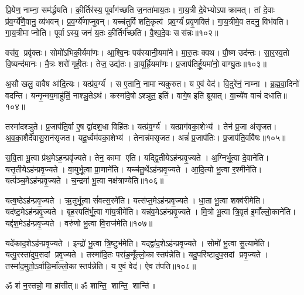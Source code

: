 प्रि॒येण॒ नाम्ना॒ सम॑र्द्धयति। 
की॒र्तिर॑स्य॒ पूर्वाग॑च्छति ज॒नता॑माय॒तः। 
गा॒य॒त्री दे॒वेभ्योऽपाक्रामत्। 
तां दे॒वाः प्र॑व॒र्ग्ये॑णै॒वानु॒ व्य॑भवन्। 
प्र॒व॒र्ग्ये॑णाप्नुवन्। 
यच्च॑तुर्विशति॒कृत्व॑ प्रव॒र्ग्यं॑ प्रवृ॒णक्ति॑। 
गा॒य॒त्रीमे॒व तदनु॒ विभ॑वति। 
गा॒य॒त्रीमाप्नोति। 
पूर्वाऽस्य॒ जनं॑ य॒तः की॒र्तिर्ग॑च्छति। 
वै॒श्व॒दे॒वः सस॑न्नः॥१०२॥

वस॑व॒ प्रवृ॑क्तः। 
सोमो॑ऽभिकी॒र्यमा॑णः। 
आ॒श्वि॒नः पय॑स्यानी॒यमा॑ने। 
मा॒रु॒तः क्वथ\sn{}। 
पौ॒ष्ण उद॑न्तः। 
सा॒र॒स्व॒तो वि॒ष्यन्द॑मानः। 
मै॒त्रः  शरो॑ गृही॒तः। 
तेज॒ उद्य॑तः। 
वा॒युर्ह्रि॒यमा॑णः। 
प्र॒जाप॑तिर्\mbox{}हू॒यमा॑नो॒ वाग्घु॒तः॥१०३॥

अ॒सौ खलु॒ वावैष आ॑दि॒त्यः। 
यत्प्र॑व॒र्ग्य॑। 
स ए॒तानि॒ नामान्यकुरुत। 
य ए॒वं वेद॑। 
वि॒दुरे॑नं॒ नाम्ना। 
ब्र॒ह्म॒वा॒दिनो॑ वदन्ति। 
यन्मृ॒न्मय॒माहु॑तिं॒ नाश्ञु॒तेऽथ॑। 
कस्मा॑दे॒षोऽश्ञुत॒ इति॑। 
वागे॒ष इति॑ ब्रूयात्। 
वा॒च्ये॑व वाचं॑ दधाति॥१०४॥

तस्मा॑दश्ञुते। 
प्र॒जाप॑ति॒र्वा ए॒ष द्वा॑दश॒धा विहि॑तः। 
यत्प्र॑व॒र्ग्य॑। 
यत्प्राग॑वका॒शेभ्य॑। 
तेन॑ प्र॒जा अ॑सृजत। 
अ॒व॒का॒शैर्दे॑वासु॒रान॑सृजत। 
यदू॒र्ध्वम॑वका॒शेभ्य॑। 
तेनान्न॑म\-सृजत। 
अन्नं॑ प्र॒जाप॑तिः। 
प्र॒जाप॑ति॒र्वावैषः॥१०५॥
\anuvakamend[व॒द॒न्ति॒ त॒नुवा॒ सस॑न्नो हू॒यमा॑नो॒ वाग्घु॒तो द॑धात्ये॒षः]

स॒वि॒ता भू॒त्वा प्र॑थ॒मेऽह॒न्प्रवृ॑ज्यते। 
तेन॒ कामा एति। 
यद्द्वि॒तीयेऽह॑न्प्रवृ॒ज्यते। 
अ॒ग्निर्भू॒त्वा दे॒वाने॑ति। 
यत्तृ॒तीयेऽह॑न्प्र\-वृ॒ज्यते। 
वा॒युर्भू॒त्वा प्रा॒णाने॑ति। 
यच्च॑तु॒र्थेऽह॑न्प्रवृ॒ज्यते। 
आ॒दि॒त्यो भू॒त्वा र॒श्मीने॑ति। 
यत्प॑ञ्च॒मेऽह॑न्प्रवृ॒ज्यते। 
च॒न्द्रमा॑ भू॒त्वा नक्ष॑त्राण्येति॥१०६॥

यत्ष॒ष्ठेऽह॑न्प्रवृ॒ज्यते। 
ऋ॒तुर्भू॒त्वा सं॑वत्स॒रमे॑ति। 
यत्स॑प्त॒मेऽह॑न्प्र\-वृ॒ज्यते। 
धा॒ता भू॒त्वा शक्व॑रीमेति। 
यद॑ष्ट॒मेऽह॑न्प्रवृ॒ज्यते। 
बृह॒स्पति॑र्भू॒त्वा गा॑य॒त्रीमे॑ति। 
यन्न॑व॒मेऽह॑न्प्रवृ॒ज्यते। 
मि॒त्रो भू॒त्वा त्रि॒वृत॑ इ॒माँल्लो॒काने॑ति। 
यद्द॑श॒मेऽह॑न्प्रवृ॒ज्यते। 
वरु॑णो भू॒त्वा वि॒राज॑मेति॥१०७॥

यदे॑काद॒शेऽह॑न्प्रवृ॒ज्यते। 
इन्द्रो॑ भू॒त्वा त्रि॒ष्टुभ॑मेति। 
यद्द्वा॑द॒शेऽह॑न्प्र\-वृ॒ज्यते। 
सोमो॑ भू॒त्वा सु॒त्यामे॑ति। 
यत्पु॒रस्ता॑दुप॒सदां प्रवृ॒ज्यते। 
तस्मा॑दि॒तः परा॑ङ॒मूँल्लो॒का\-स्तप॑न्नेति। 
यदु॒परि॑ष्टादुप॒सदां प्रवृ॒ज्यते। 
तस्मा॑द॒मुतो॒ऽर्वा\-ङि॒माँल्लो॒का\-स्तप॑न्नेति। 
य ए॒वं वेद॑। 
ऐव त॑पति॥१०८॥
\anuvakamend[नक्ष॑त्राण्येति वि॒राज॑मेति तपति]

ॐ शं न॒स्तन्नो॒ मा हा॑सीत्॥ ॐ शान्ति॒ शान्ति॒ शान्ति॑॥

\closesection